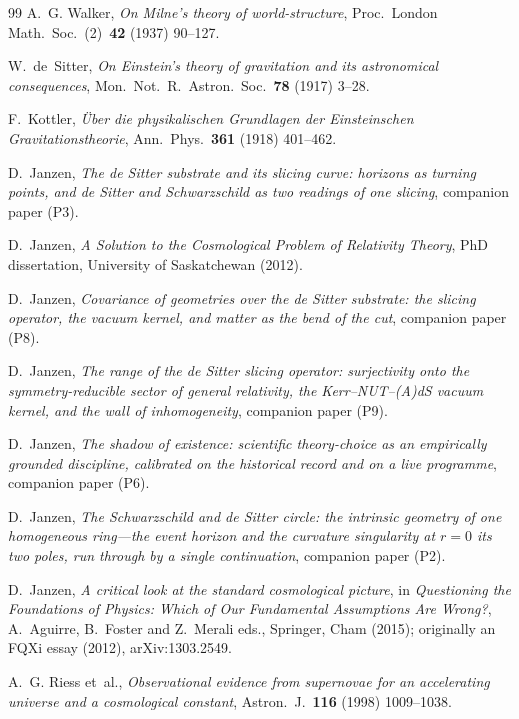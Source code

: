 \documentclass[11pt,a4paper]{article}
\theoremstyle{plain}
\theoremstyle{definition}
\theoremstyle{remark}
\begin{document}
\begin{thebibliography}{99}
A.~G. Walker,
\emph{On Milne's theory of world-structure},
Proc.~London Math.~Soc.~(2)~\textbf{42} (1937) 90--127.

W.~de~Sitter,
\emph{On Einstein's theory of gravitation and its astronomical consequences},
Mon.~Not.~R.~Astron.~Soc.~\textbf{78} (1917) 3--28.

F.~Kottler,
\emph{\"Uber die physikalischen Grundlagen der Einsteinschen Gravitationstheorie},
Ann.~Phys.~\textbf{361} (1918) 401--462.

D.~Janzen,
\emph{The de Sitter substrate and its slicing curve: horizons as turning points, and de Sitter and Schwarzschild as two readings of one slicing}, companion paper (P3).

 D.~Janzen, \emph{A Solution to the Cosmological Problem of Relativity Theory},
PhD dissertation, University of Saskatchewan (2012).

D.~Janzen,
\emph{Covariance of geometries over the de Sitter substrate: the slicing operator, the vacuum kernel, and matter as the bend of the cut}, companion paper (P8).

D.~Janzen,
\emph{The range of the de Sitter slicing operator: surjectivity onto the symmetry-reducible sector of general relativity, the Kerr--NUT--(A)dS vacuum kernel, and the wall of inhomogeneity}, companion paper (P9).

D.~Janzen,
\emph{The shadow of existence: scientific theory-choice as an empirically grounded discipline, calibrated on the historical record and on a live programme}, companion paper (P6).

D.~Janzen,
\emph{The Schwarzschild and de Sitter circle: the intrinsic geometry of one homogeneous ring---the event horizon and the curvature singularity at $r=0$ its two poles, run through by a single continuation}, companion paper (P2).

D.~Janzen,
\emph{A critical look at the standard cosmological picture},
in \emph{Questioning the Foundations of Physics: Which of Our Fundamental Assumptions Are Wrong?}, A.~Aguirre, B.~Foster and Z.~Merali eds., Springer, Cham (2015); originally an FQXi essay (2012), arXiv:1303.2549.

A.~G. Riess et~al.,
\emph{Observational evidence from supernovae for an accelerating universe and a cosmological constant},
Astron.~J.~\textbf{116} (1998) 1009--1038.


\end{thebibliography}
\end{document}
